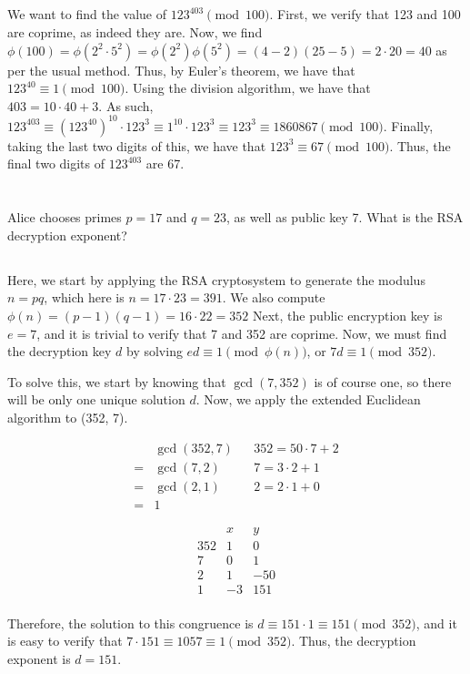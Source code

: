 \documentclass{article}
\begin{document}
\subsection{}

We want to find the value of $123^{403} \pmod{100}$. First, we verify that 123 and 100 are coprime, as indeed they are. Now, we find $\phi(100) = \phi(2^2 \cdot 5^2) = \phi(2^2)\phi(5^2) = (4 - 2)(25 - 5) = 2 \cdot 20 = 40$ as per the usual method. Thus, by Euler's theorem, we have that $123^{40} \equiv 1 \pmod{100}$. Using the division algorithm, we have that $403 = 10 \cdot 40 + 3$. As such, $123^{403} \equiv (123^{40})^10 \cdot 123^3 \equiv 1^10 \cdot 123^3 \equiv 123^3 \equiv 1860867 \pmod{100}$. Finally, taking the last two digits of this, we have that $123^3 \equiv 67 \pmod{100}$. Thus, the final two digits of $123^{403}$ are 67.

\section{}

Alice chooses primes $p=17$ and $q=23$, as well as public key 7. What is the RSA decryption exponent?

\subsection{}

Here, we start by applying the RSA cryptosystem to generate the modulus $n = pq$, which here is $n = 17 \cdot 23 = 391$. We also compute $\phi(n) = (p - 1)(q - 1) = 16 \cdot 22 = 352$ Next, the public encryption key is $e=7$, and it is trivial to verify that 7 and 352 are coprime. Now, we must find the decryption key $d$ by solving $ed \equiv 1 \pmod{\phi(n)}$, or $7d \equiv 1 \pmod{352}$.

To solve this, we start by knowing that $\gcd(7, 352)$ is of course one, so there will be only one unique solution $d$. Now, we apply the extended Euclidean algorithm to (352, 7).

\begin{align*}
    & \gcd(352,7) & & 352 = 50 \cdot 7 + 2 \\
    = & \gcd(7,2) & & 7 = 3 \cdot 2 + 1 \\
    = & \gcd(2, 1) & & 2 = 2 \cdot 1 + 0 \\
    = & 1
\end{align*}

$$
\begin{matrix}
  & x & y\\
352 & 1 & 0 \\
7 & 0 & 1 \\
2 & 1 & -50 \\
1 & -3 & 151 \\
\end{matrix}
$$

Therefore, the solution to this congruence is $d \equiv 151 \cdot 1 \equiv 151 \pmod{352}$, and it is easy to verify that $7 \cdot 151 \equiv 1057 \equiv 1 \pmod{352}$. Thus, the decryption exponent is $d=151$.
\end{document}
